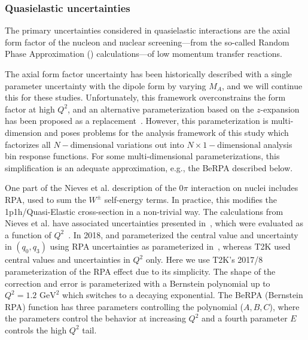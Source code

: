 \subsubsection{Quasielastic uncertainties}
The primary uncertainties considered in quasielastic interactions are the axial form factor of the nucleon and nuclear screening---from the so-called Random Phase Approximation () calculations---of low momentum transfer reactions.

The axial form factor uncertainty has been historically described with a single parameter uncertainty with the dipole form by varying $M_A$, and we will continue this for these studies.  Unfortunately, this framework overconstrains the form factor at high $Q^2$, and an alternative parameterization based on the $z$-expansion has been proposed as a replacement~\cite{Meyer:2016oeg}.  However, this parameterization is multi-dimension and poses problems for the analysis framework of this study which factorizes all $N-\textrm{dimensional}$ variations out into $N\times{}1-\textrm{dimensional}$ analysis bin response functions. For some multi-dimensional parameterizations, this simplification is an adequate approximation, e.g., the BeRPA described below. %

One part of the Nieves et al.\cite{nieves1,nieves2} description of the $0\pi$ interaction on nuclei includes RPA, used to sum the $W^\pm$ self-energy terms. In practice, this modifies the 1p1h/Quasi-Elastic cross-section in a non-trivial way. The calculations from Nieves et al. have associated uncertainties presented in~\cite{nieves_uncert}, which were evaluated as a function of $Q^2$~\cite{sanchez-private}. In 2018, \minerva and \nova parameterized the central value and uncertainty in $(q_0, q_3)$ using RPA uncertainties as parameterized in~\cite{RikRPA}, whereas T2K used central values and uncertainties in $Q^2$ only. Here we use T2K's 2017/8 parameterization of the RPA effect\cite{t2k_2018} due to its simplicity. The shape of the correction and error is parameterized with a Bernstein polynomial up to $Q^2=1.2\text{ GeV}^2$ which switches to a decaying exponential. The BeRPA (Bernstein RPA) function has three parameters controlling the polynomial ($A, B, C$), where the parameters control the behavior at increasing $Q^2$ and a fourth parameter $E$ controls the high $Q^2$ tail.

